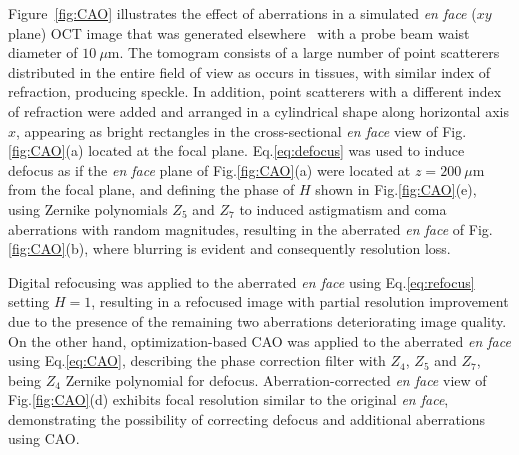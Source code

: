 Figure~\ref{fig:CAO} illustrates the effect of aberrations in a simulated \textit{en face} ($xy$ plane) OCT image that was generated elsewhere~\cite{Cuartas-Velez2017_Formacion} with a probe beam waist diameter of $10~\mu$m. The tomogram consists of a large number of point scatterers distributed in the entire field of view as occurs in tissues, with similar index of refraction, producing speckle. In addition, point scatterers with a different index of refraction were added and arranged in a cylindrical shape along horizontal axis $x$, appearing as bright rectangles in the cross-sectional \textit{en face} view of Fig.\ref{fig:CAO}(a) located at the focal plane. Eq.\eqref{eq:defocus} was used to induce defocus as if the \textit{en face} plane of Fig.\ref{fig:CAO}(a) were located at $z=200~\mu$m from the focal plane, and defining the phase of $H$ shown in Fig.\ref{fig:CAO}(e), using Zernike polynomials $Z_5$ and $Z_7$ to induced astigmatism and coma aberrations with random magnitudes, resulting in the aberrated \textit{en face} of Fig.\ref{fig:CAO}(b), where blurring is evident and consequently resolution loss.

Digital refocusing was applied to the aberrated \textit{en face} using Eq.\eqref{eq:refocus} setting $H=1$, resulting in a refocused image with partial resolution improvement due to the presence of the remaining two aberrations deteriorating image quality. On the other hand, optimization-based CAO was applied to the aberrated \textit{en face} using Eq.\eqref{eq:CAO}, describing the phase correction filter with $Z_4$, $Z_5$ and $Z_7$, being $Z_4$ Zernike polynomial for defocus. Aberration-corrected \textit{en face} view of Fig.\ref{fig:CAO}(d) exhibits focal resolution similar to the original \textit{en face}, demonstrating the possibility of correcting defocus and additional aberrations using CAO.
 
